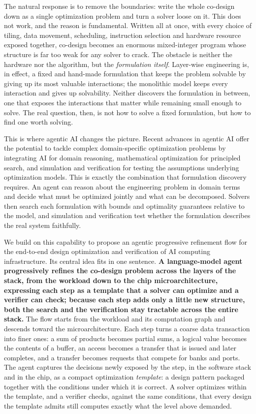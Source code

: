 \documentclass[11pt]{article}
\begin{document}
The natural response is to remove the boundaries: write the whole co-design down as a single optimization problem and turn a solver loose on it. This does not work, and the reason is fundamental. Written all at once, with every choice of tiling, data movement, scheduling, instruction selection and hardware resource exposed together, co-design becomes an enormous mixed-integer program whose structure is far too weak for any solver to crack. The obstacle is neither the hardware nor the algorithm, but the \emph{formulation itself}. Layer-wise engineering is, in effect, a fixed and hand-made formulation that keeps the problem solvable by giving up its most valuable interactions; the monolithic model keeps every interaction and gives up solvability. Neither discovers the formulation in between, one that exposes the interactions that matter while remaining small enough to solve. The real question, then, is not how to solve a fixed formulation, but how to find one worth solving.

This is where agentic AI changes the picture. Recent advances in agentic AI offer the potential to tackle complex domain-specific optimization problems by integrating AI for domain reasoning, mathematical optimization for principled search, and simulation and verification for testing the assumptions underlying optimization models. This is exactly the combination that formulation discovery requires. An agent can reason about the engineering problem in domain terms and decide what must be optimized jointly and what can be decomposed. Solvers then search each formulation with bounds and optimality guarantees relative to the model, and simulation and verification test whether the formulation describes the real system faithfully.

We build on this capability to propose an agentic progressive refinement flow for the end-to-end design optimization and verification of AI computing infrastructure. Its central idea fits in one sentence. \textbf{A language-model agent progressively refines the co-design problem across the layers of the stack, from the workload down to the chip microarchitecture, expressing each step as a template that a solver can optimize and a verifier can check; because each step adds only a little new structure, both the search and the verification stay tractable across the entire stack.} The flow starts from the workload and its computation graph and descends toward the microarchitecture. Each step turns a coarse data transaction into finer ones: a sum of products becomes partial sums, a logical value becomes the contents of a buffer, an access becomes a transfer that is issued and later completes, and a transfer becomes requests that compete for banks and ports. The agent captures the decisions newly exposed by the step, in the software stack and in the chip, as a compact optimization \emph{template}: a design pattern packaged together with the conditions under which it is correct. A solver optimizes within the template, and a verifier checks, against the same conditions, that every design the template admits still computes exactly what the level above demanded.
\end{document}
